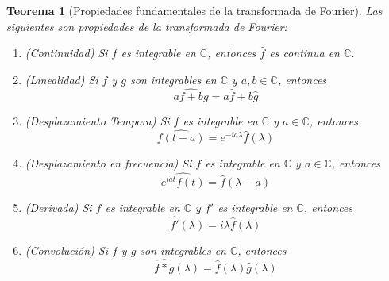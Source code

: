 \documentclass[11pt]{book}
\theoremstyle{plain}
\newtheorem{teo}[proposición]{Teorema}
\theoremstyle{definition}
\newcommand{\C}{\mathbb{C}}
\begin{document}
\begin{teo}[Propiedades fundamentales de la transformada de Fourier]
    Las siguientes son propiedades de la transformada de Fourier:
    \begin{enumerate}
        \item (Continuidad) Si $f$ es integrable en $\C$, entonces $\hat{f}$ es continua en $\C$.
        \item (Linealidad) Si $f$ y $g$ son integrables en $\C$ y $a,b \in \C$, entonces
        \[
            \widehat{af + bg} = a\hat{f} + b\hat{g}
        \]
        \item (Desplazamiento Tempora) Si $f$ es integrable en $\C$ y $a \in \C$, entonces
        \[
            \widehat{f(t-a)} = e^{-ia\lambda}\hat{f}(\lambda)
        \]
        \item (Desplazamiento en frecuencia) Si $f$ es integrable en $\C$ y $a \in \C$, entonces
        \[
            \widehat{e^{iat}f(t)} = \hat{f}(\lambda - a)
        \]
        \item (Derivada) Si $f$ es integrable en $\C$ y $f'$ es integrable en $\C$, entonces
        \[
            \widehat{f'}(\lambda) = i\lambda \hat{f}(\lambda)
        \]
        \item (Convolución) Si $f$ y $g$ son integrables en $\C$, entonces
        \[
            \widehat{f*g}(\lambda) = \hat{f}(\lambda)\hat{g}(\lambda)
        \]
    \end{enumerate}
\end{teo}
\end{document}

